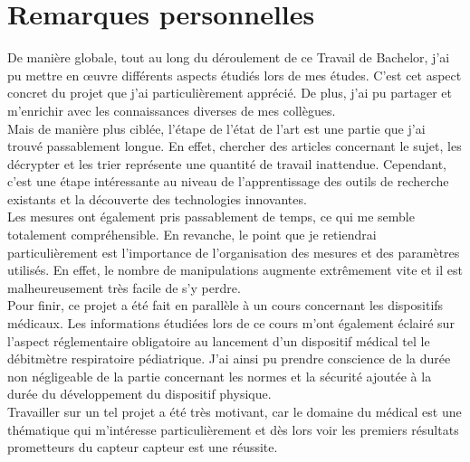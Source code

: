 \section{Remarques personnelles}
De manière globale, tout au long du déroulement de ce Travail de Bachelor, j'ai pu mettre en \oe uvre différents aspects étudiés lors de mes études. C'est cet 
aspect concret du projet que j'ai particulièrement apprécié. De plus, j'ai pu partager et m'enrichir avec les connaissances diverses de mes 
collègues. \\
Mais de manière plus ciblée, l'étape de l'état de l'art est une partie que j'ai trouvé passablement longue. En effet, chercher des articles concernant le sujet, les 
décrypter et les trier représente une quantité de travail inattendue. Cependant, c'est une étape intéressante au niveau de 
l'apprentissage des outils de recherche existants et la découverte des technologies innovantes. \\
Les mesures ont également pris passablement de temps, ce qui me semble totalement compréhensible. En revanche, le point que je retiendrai particulièrement 
est l'importance de l'organisation des mesures et des paramètres utilisés. En effet, le nombre de manipulations augmente extrêmement vite et 
il est malheureusement très facile de s'y perdre. \\
Pour finir, ce projet a été fait en parallèle à un cours concernant les dispositifs médicaux. Les informations étudiées lors de ce cours m'ont également 
éclairé sur l'aspect réglementaire obligatoire au lancement d'un dispositif médical tel le débitmètre respiratoire pédiatrique. J'ai ainsi pu 
prendre conscience de la durée non négligeable de la partie concernant les normes et la sécurité ajoutée à la durée du développement du dispositif 
physique. \\
Travailler sur un tel projet a été très motivant, car le domaine du médical est une thématique qui m'intéresse particulièrement 
et dès lors voir les premiers résultats prometteurs du capteur \gls{capteur} est une réussite. 


\vfil
\hspace{8cm}\makeatletter\@author\makeatother\par
\hspace{8cm}\begin{minipage}{5cm}
      \printsignature
\end{minipage}